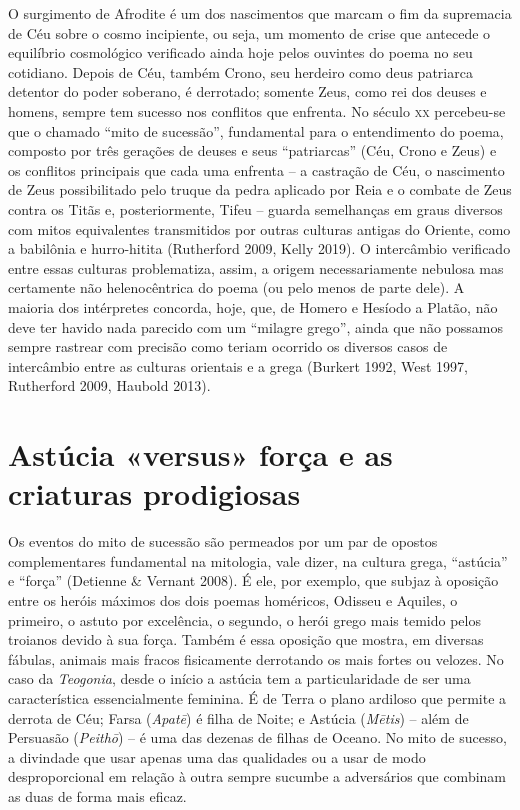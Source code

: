 O surgimento de Afrodite é um dos nascimentos que marcam o fim da
supremacia de Céu sobre o cosmo incipiente, ou seja, um momento de crise
que antecede o equilíbrio cosmológico verificado ainda hoje pelos
ouvintes do poema no seu cotidiano. Depois de Céu, também Crono, seu
herdeiro como deus patriarca detentor do poder soberano, é derrotado;
somente Zeus, como rei dos deuses e homens, sempre tem sucesso nos
conflitos que enfrenta. No século \textsc{xx} percebeu-se que o chamado ``mito de
sucessão'', fundamental para o entendimento do poema, composto por três
gerações de deuses e seus ``patriarcas'' (Céu, Crono e Zeus) e os
conflitos principais que cada uma enfrenta -- a castração de Céu, o
nascimento de Zeus possibilitado pelo truque da pedra aplicado por Reia
e o combate de Zeus contra os Titãs e, posteriormente, Tifeu -- guarda
semelhanças em graus diversos com mitos equivalentes transmitidos por
outras culturas antigas do Oriente, como a babilônia e hurro-hitita
(Rutherford 2009, Kelly 2019). O intercâmbio verificado entre essas
culturas problematiza, assim, a origem necessariamente nebulosa mas
certamente não helenocêntrica do poema (ou pelo menos de parte dele). A
maioria dos intérpretes concorda, hoje, que, de Homero e Hesíodo a
Platão, não deve ter havido nada parecido com um ``milagre grego'',
ainda que não possamos sempre rastrear com precisão como teriam ocorrido
os diversos casos de intercâmbio entre as culturas orientais e a grega
(Burkert 1992, West 1997, Rutherford 2009, Haubold 2013).

\section{Astúcia «versus» força e as criaturas prodigiosas}

Os eventos do mito de sucessão são permeados por um par de opostos
complementares fundamental na mitologia, vale dizer, na cultura grega,
``astúcia'' e ``força'' (Detienne \& Vernant 2008). É ele, por exemplo,
que subjaz à oposição entre os heróis máximos dos dois poemas homéricos,
Odisseu e Aquiles, o primeiro, o astuto por excelência, o segundo, o
herói grego mais temido pelos troianos devido à sua força. Também é essa
oposição que mostra, em diversas fábulas, animais mais fracos
fisicamente derrotando os mais fortes ou velozes. No caso da
\emph{Teogonia}, desde o início a astúcia tem a particularidade de ser
uma característica essencialmente feminina. É de Terra o plano ardiloso
que permite a derrota de Céu; Farsa (\emph{Apatē}) é filha de Noite; e
Astúcia (\emph{Mētis}) -- além de Persuasão (\emph{Peithō}) -- é uma das
dezenas de filhas de Oceano. No mito de sucesso, a divindade que usar
apenas uma das qualidades ou a usar de modo desproporcional em relação à
outra sempre sucumbe a adversários que combinam as duas de forma mais
eficaz.

